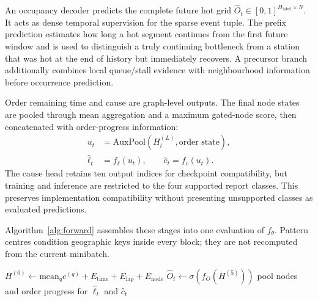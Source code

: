 \documentclass[a4paper,fleqn]{cas-dc}
\begin{document}
An occupancy decoder predicts the complete future hot grid $\hat O_t\in[0,1]^{H_{\mathrm{label}}\times N}$. It acts as dense temporal supervision for the sparse event tuple. The prefix prediction estimates how long a hot segment continues from the first future window and is used to distinguish a truly continuing bottleneck from a station that was hot at the end of history but immediately recovers. A precursor branch additionally combines local queue/stall evidence with neighbourhood information before occurrence prediction.


Order remaining time and cause are graph-level outputs. The final node states are pooled through mean aggregation and a maximum gated-node score, then concatenated with order-progress information:
\begin{equation}
\begin{aligned}
u_t&=\mathrm{AuxPool}(H_t^{(L)},\text{order state}),\\
\hat\ell_t&=f_\ell(u_t),\qquad \hat c_t=f_c(u_t).
\end{aligned}
\end{equation}
The cause head retains ten output indices for checkpoint compatibility, but training and inference are restricted to the four supported report classes. This preserves implementation compatibility without presenting unsupported classes as evaluated predictions.


Algorithm~\ref{alg:forward} assembles these stages into one evaluation of $f_{\theta}$. Pattern centres condition geographic keys inside every block; they are not recomputed from the current minibatch.


\begin{algorithm}[t]
\caption{Delay-pattern forward pass.}
\label{alg:forward}
\;
$H^{(0)}\leftarrow\mathrm{mean}_{q}e^{(q)}+E_{\mathrm{time}}+E_{\mathrm{lap}}+E_{\mathrm{node}}$\;
\;
\;
$\hat O_t\leftarrow\sigma(f_O(H^{(5)}))$\;
pool nodes and order progress for $\hat\ell_t$ and $\hat c_t$\;
\end{algorithm}
\end{document}
